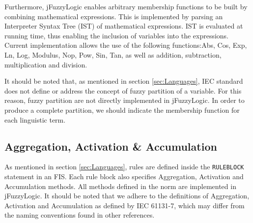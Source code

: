 \documentclass[11pt,twoside]{article}
\begin{document}
\begin{multicols}{2}
Furthermore, jFuzzyLogic enables arbitrary membership functions to be built by combining mathematical expressions. This is implemented by parsing an Interpreter Syntax Tree (IST) of mathematical expressions. IST is evaluated at running time, thus enabling the inclusion of variables into the expressions. Current implementation allows the use of the following functions:Abs, Cos, Exp, Ln, Log, Modulus, Nop, Pow, Sin, Tan, as well as addition, subtraction, multiplication and division.

It should be noted that, as mentioned in section \ref{sec:Languages}, IEC standard does not define or address the concept of fuzzy partition of a variable.
For this reason, fuzzy partition are not directly implemented in jFuzzyLogic.
In order to produce a complete partition, we should indicate the membership function for each linguistic term.


\subsection{Aggregation, Activation \& Accumulation\label{sec:aggActAcc}}

As mentioned in section \ref{sec:Languages}, rules are defined inside the \texttt{RULEBLOCK} statement in an FIS. Each rule  block also specifies Aggregation, Activation and Accumulation methods. All methods defined in the norm are implemented in jFuzzyLogic. It should be noted that we adhere to the definitions of Aggregation, Activation and Accumulation as defined by IEC 61131-7, which may differ from the naming conventions found in other references.


\end{multicols}
\end{document}
